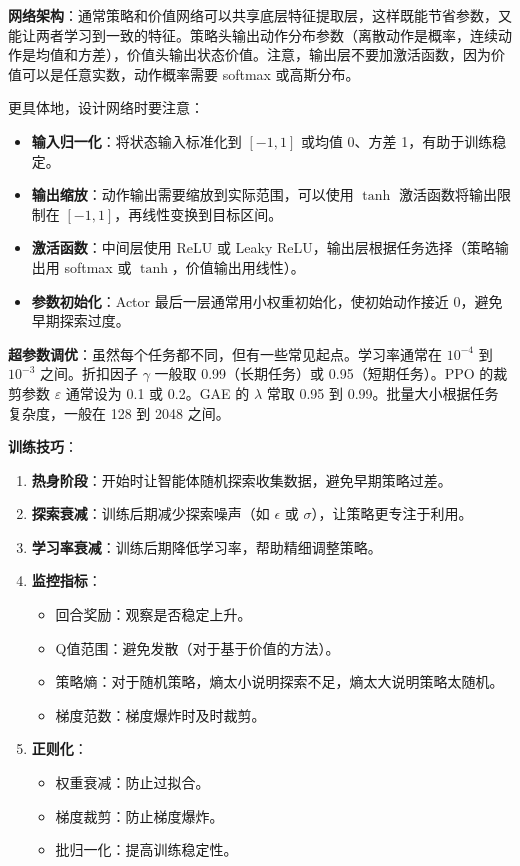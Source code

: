 \documentclass[lang=cn,zihao=-4,a4paper,fontset=windows]{beautybook}
\begin{document}
\textbf{网络架构}：通常策略和价值网络可以共享底层特征提取层，这样既能节省参数，又能让两者学习到一致的特征。策略头输出动作分布参数（离散动作是概率，连续动作是均值和方差），价值头输出状态价值。注意，输出层不要加激活函数，因为价值可以是任意实数，动作概率需要 softmax 或高斯分布。

更具体地，设计网络时要注意：
\begin{itemize}
    \item \textbf{输入归一化}：将状态输入标准化到 $[-1, 1]$ 或均值 0、方差 1，有助于训练稳定。
    \item \textbf{输出缩放}：动作输出需要缩放到实际范围，可以使用 $\tanh$ 激活函数将输出限制在 $[-1, 1]$，再线性变换到目标区间。
    \item \textbf{激活函数}：中间层使用 ReLU 或 Leaky ReLU，输出层根据任务选择（策略输出用 softmax 或 $\tanh$，价值输出用线性）。
    \item \textbf{参数初始化}：Actor 最后一层通常用小权重初始化，使初始动作接近 0，避免早期探索过度。
\end{itemize}

\textbf{超参数调优}：虽然每个任务都不同，但有一些常见起点。学习率通常在 $10^{-4}$ 到 $10^{-3}$ 之间。折扣因子 $\gamma$ 一般取 0.99（长期任务）或 0.95（短期任务）。PPO 的裁剪参数 $\varepsilon$ 通常设为 0.1 或 0.2。GAE 的 $\lambda$ 常取 0.95 到 0.99。批量大小根据任务复杂度，一般在 128 到 2048 之间。

\textbf{训练技巧}：
\begin{enumerate}
    \item \textbf{热身阶段}：开始时让智能体随机探索收集数据，避免早期策略过差。
    \item \textbf{探索衰减}：训练后期减少探索噪声（如 $\epsilon$ 或 $\sigma$），让策略更专注于利用。
    \item \textbf{学习率衰减}：训练后期降低学习率，帮助精细调整策略。
    \item \textbf{监控指标}：
    \begin{itemize}
        \item 回合奖励：观察是否稳定上升。
        \item Q值范围：避免发散（对于基于价值的方法）。
        \item 策略熵：对于随机策略，熵太小说明探索不足，熵太大说明策略太随机。
        \item 梯度范数：梯度爆炸时及时裁剪。
    \end{itemize}
    \item \textbf{正则化}：
    \begin{itemize}
        \item 权重衰减：防止过拟合。
        \item 梯度裁剪：防止梯度爆炸。
        \item 批归一化：提高训练稳定性。
    \end{itemize}
\end{enumerate}
\end{document}
